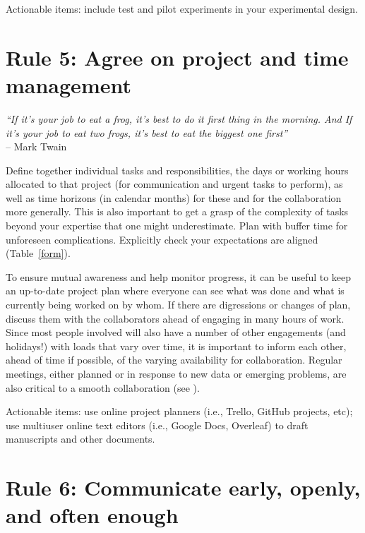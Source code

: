 \documentclass{article}
\begin{document}
Actionable items: include test and pilot experiments in your experimental design.

\section*{Rule 5: Agree on project and time management} %
\label{rule5_time}

\begin{flushright}
\rightskip=1cm\textit{``If it's your job to eat a frog, it's best to do it first thing in the morning. And If it's your job to eat two frogs, it's best to eat the biggest one first''} \\
\vspace{.2em}
\rightskip=0cm -- Mark Twain
\end{flushright}

Define together individual tasks and responsibilities, the days or working hours allocated to that project (for communication and urgent tasks to perform), as well as time horizons (in calendar months) for these and for the collaboration more generally. This is also important to get a grasp of the complexity of tasks beyond your expertise that one might underestimate. Plan with buffer time for unforeseen complications. Explicitly check your expectations are aligned (Table~\ref{form}).

To ensure mutual awareness and help monitor progress, it can be useful to keep an up-to-date project plan where everyone can see what was done and what is currently being worked on by whom. If there are digressions or changes of plan, discuss them with the collaborators ahead of engaging in many hours of work. Since most people involved will also have a number of other engagements (and holidays!) with loads that vary over time, it is important to inform each other, ahead of time if possible, of the varying availability for collaboration. Regular meetings, either planned or in response to new data or emerging problems, are also critical to a smooth collaboration (see ). 

Actionable items: use online project planners (i.e., Trello, GitHub projects, etc); use multiuser online text editors (i.e., Google Docs, Overleaf) to draft manuscripts and other documents.

\section*{Rule 6: Communicate early{\color{red},} openly{\color{red},} and often enough} %
\label{rule6_communication}
\end{document}
